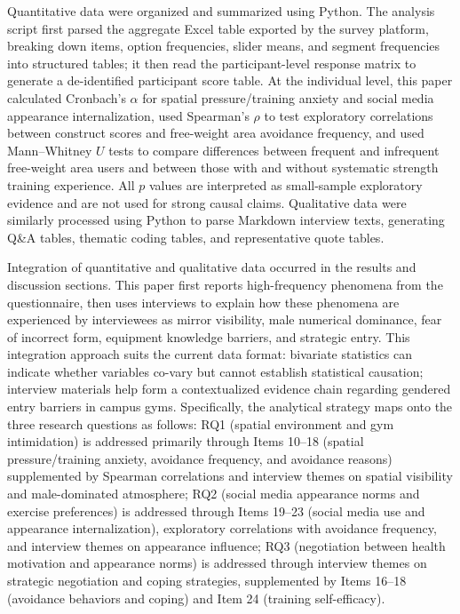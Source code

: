 Quantitative data were organized and summarized using Python.
The analysis script first parsed the aggregate Excel table exported by the survey platform, breaking down items, option frequencies, slider means, and segment frequencies into structured tables; it then read the participant-level response matrix to generate a de-identified participant score table.
At the individual level, this paper calculated Cronbach's $\alpha$ for spatial pressure/training anxiety and social media appearance internalization, used Spearman's $\rho$ to test exploratory correlations between construct scores and free-weight area avoidance frequency, and used Mann--Whitney $U$ tests to compare differences between frequent and infrequent free-weight area users and between those with and without systematic strength training experience.
All $p$ values are interpreted as small-sample exploratory evidence and are not used for strong causal claims.
Qualitative data were similarly processed using Python to parse Markdown interview texts, generating Q\&A tables, thematic coding tables, and representative quote tables.

Integration of quantitative and qualitative data occurred in the results and discussion sections.
This paper first reports high-frequency phenomena from the questionnaire, then uses interviews to explain how these phenomena are experienced by interviewees as mirror visibility, male numerical dominance, fear of incorrect form, equipment knowledge barriers, and strategic entry.
This integration approach suits the current data format: bivariate statistics can indicate whether variables co-vary but cannot establish statistical causation; interview materials help form a contextualized evidence chain regarding gendered entry barriers in campus gyms.
Specifically, the analytical strategy maps onto the three research questions as follows: RQ1 (spatial environment and gym intimidation) is addressed primarily through Items 10--18 (spatial pressure/training anxiety, avoidance frequency, and avoidance reasons) supplemented by Spearman correlations and interview themes on spatial visibility and male-dominated atmosphere; RQ2 (social media appearance norms and exercise preferences) is addressed through Items 19--23 (social media use and appearance internalization), exploratory correlations with avoidance frequency, and interview themes on appearance influence; RQ3 (negotiation between health motivation and appearance norms) is addressed through interview themes on strategic negotiation and coping strategies, supplemented by Items 16--18 (avoidance behaviors and coping) and Item 24 (training self-efficacy).

